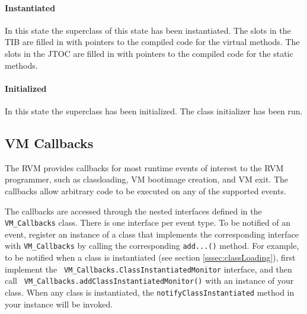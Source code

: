 \paragraph{Instantiated}
In this state the superclass of this state has been instantiated. 
The slots in the TIB are filled in with pointers to the compiled code for the 
virtual methods. 
The slots in the JTOC are filled in with pointers to the compiled code for the 
static methods.

\paragraph{Initialized} 
In this state the superclass has been initialized. The class initializer has 
been run. 

\subsection{VM Callbacks}\label{sssec:callbacks}

The RVM provides callbacks for most runtime events of interest to the RVM
programmer, such as classloading, VM bootimage creation, and VM exit.  The
callbacks allow arbitrary code to be executed on any of the supported events.

The callbacks are accessed through the nested interfaces defined in the {\tt
VM\_Callbacks} class.  There is one interface per event type.  To be notified
of an event, register an instance of a class that implements the corresponding
interface with {\tt VM\_Callbacks} by calling the corresponding {\tt add...()}
method.  For example, to be notified when a class is instantiated (see section
\ref{sssec:classLoading}), first implement the {\tt
VM\_Callbacks.ClassInstantiatedMonitor} interface, and then call {\tt
VM\_Callbacks.addClassInstantiatedMonitor()} with an instance of your class.
When any class is instantiated, the {\tt notifyClassInstantiated} method in
your instance will be invoked.

